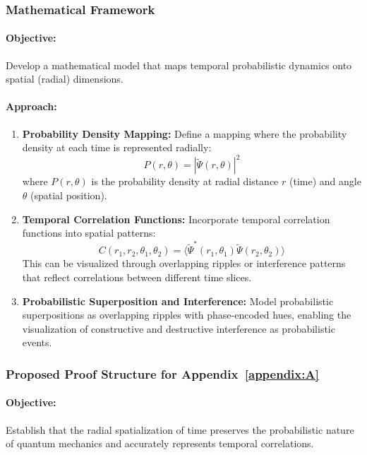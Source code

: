 \documentclass[12pt]{article}
\begin{document}
\subsubsection{Mathematical Framework}
\paragraph{Objective:} Develop a mathematical model that maps temporal probabilistic dynamics onto spatial (radial) dimensions.

\paragraph{Approach:}
\begin{enumerate}
    \item \textbf{Probability Density Mapping:}
    Define a mapping where the probability density at each time is represented radially:
    \[
    P(r, \theta) = |\tilde{\Psi}(r, \theta)|^2
    \]
    where \(P(r, \theta)\) is the probability density at radial distance \(r\) (time) and angle \(\theta\) (spatial position).
    
    \item \textbf{Temporal Correlation Functions:}
    Incorporate temporal correlation functions into spatial patterns:
    \[
    C(r_1, r_2, \theta_1, \theta_2) = \langle \tilde{\Psi}^*(r_1, \theta_1) \tilde{\Psi}(r_2, \theta_2) \rangle
    \]
    This can be visualized through overlapping ripples or interference patterns that reflect correlations between different time slices.
    
    \item \textbf{Probabilistic Superposition and Interference:}
    Model probabilistic superpositions as overlapping ripples with phase-encoded hues, enabling the visualization of constructive and destructive interference as probabilistic events.
\end{enumerate}

\subsubsection{Proposed Proof Structure for Appendix~\ref{appendix:A}}
\paragraph{Objective:} Establish that the radial spatialization of time preserves the probabilistic nature of quantum mechanics and accurately represents temporal correlations.
\end{document}
